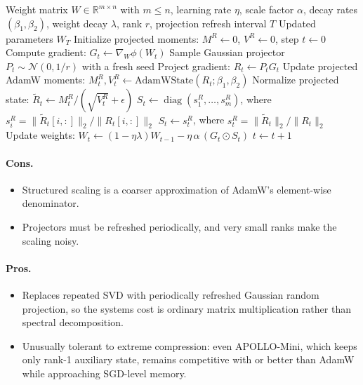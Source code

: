 \begin{algorithm}[H]
\caption{APOLLO / APOLLO-Mini Structured Gradient Scaling}
\label{alg:apollo-family}
\begin{algorithmic}[1]
\Require Weight matrix $W \in \mathbb{R}^{m \times n}$ with $m \le n$, learning rate $\eta$, scale factor $\alpha$, decay rates $(\beta_1, \beta_2)$, weight decay $\lambda$, rank $r$, projection refresh interval $T$
\Ensure Updated parameters $W_T$
\State Initialize projected moments: $M^R \gets 0$, $V^R \gets 0$, step $t \gets 0$
\Repeat
    \State Compute gradient: $G_t \gets \nabla_W \phi(W_t)$
        \State Sample Gaussian projector $P_t \sim \mathcal{N}(0, 1/r)$ with a fresh seed
    \EndIf
    \State Project gradient: $R_t \gets P_t G_t$ 
    \State Update projected AdamW moments: $M_t^R, V_t^R \gets \text{AdamWState}(R_t; \beta_1, \beta_2)$
    \State Normalize projected state: $\widetilde{R}_t \gets M_t^R / (\sqrt{V_t^R}+\epsilon)$
        \State $S_t \gets \operatorname{diag}(s_1^R, \ldots, s_m^R)$, where $s_i^R = \|\widetilde{R}_t[i,:]\|_2 / \|R_t[i,:]\|_2$
    \Else
        \State $S_t \gets s_t^R$, where $s_t^R = \|\widetilde{R}_t\|_2 / \|R_t\|_2$
    \EndIf
    \State Update weights: $W_t \gets (1-\eta\lambda)W_{t-1} - \eta\,\alpha\,(G_t \odot S_t)$
    \State $t \gets t+1$
\end{algorithmic}
\end{algorithm}

\paragraph{Cons.}
\begin{itemize}[leftmargin=*]
\item Structured scaling is a coarser approximation of AdamW's element-wise denominator.
\item Projectors must be refreshed periodically, and very small ranks make the scaling noisy.
\end{itemize}

\paragraph{Pros.}
\begin{itemize}[leftmargin=*]
\item Replaces repeated SVD with periodically refreshed Gaussian random projection, so the systems cost is ordinary matrix multiplication rather than spectral decomposition.
\item Unusually tolerant to extreme compression: even APOLLO-Mini, which keeps only rank-1 auxiliary state, remains competitive with or better than AdamW while approaching SGD-level memory.
\end{itemize}

